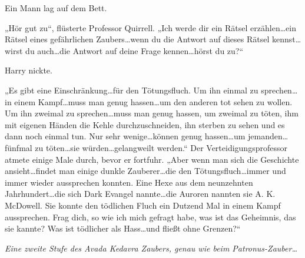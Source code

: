 Ein Mann lag auf dem Bett.

„Hör gut zu“, flüsterte Professor Quirrell.
„Ich werde dir ein Rätsel erzählen…ein Rätsel eines gefährlichen Zaubers…wenn du die Antwort auf dieses Rätsel kennst…wirst du auch…die Antwort auf deine Frage kennen…hörst du zu?“

Harry nickte.

„Es gibt eine Einschränkung…für den Tötungsfluch. Um ihn einmal zu sprechen…in einem Kampf…muss man genug hassen…um den anderen tot sehen zu wollen. Um ihn zweimal zu sprechen…muss man genug hassen, um zweimal zu töten, ihm mit eigenen Händen die Kehle durchzuschneiden, ihn sterben zu sehen und es dann noch einmal tun. Nur sehr wenige…können genug hassen…um jemanden…fünfmal zu töten…sie würden…gelangweilt werden.“
Der Verteidigungsprofessor atmete einige Male durch, bevor er fortfuhr.
„Aber wenn man sich die Geschichte ansieht…findet man einige dunkle Zauberer…die den Tötungsfluch…immer und immer wieder aussprechen konnten. Eine Hexe aus dem neunzehnten Jahrhundert…die sich Dark Evangel nannte…die Auroren nannten sie A. K. McDowell. Sie konnte den tödlichen Fluch ein Dutzend Mal in einem Kampf aussprechen. Frag dich, so wie ich mich gefragt habe, was ist das Geheimnis, das sie kannte? Was ist tödlicher als Hass…und fließt ohne Grenzen?“

\emph{Eine zweite Stufe des Avada Kedavra Zaubers, genau wie beim Patronus-Zauber…}


